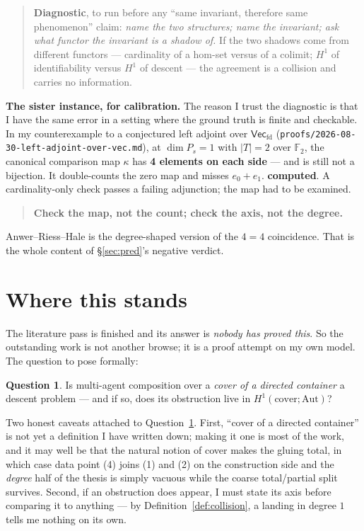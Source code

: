 \documentclass[11pt]{article}
\theoremstyle{plain}
\theoremstyle{definition}
\newtheorem{question}[theorem]{Question}
\theoremstyle{remark}
\newcommand{\Vecfd}{\mathsf{Vec}_{\mathrm{fd}}}
\newcommand{\Aut}{\mathrm{Aut}}
\newcommand{\grade}[1]{\textsf{\small\textbf{#1}}}
\begin{document}
\begin{quote}
\textbf{Diagnostic}, to run before any ``same invariant, therefore same phenomenon''
claim: \emph{name the two structures; name the invariant; ask what functor the
invariant is a shadow of.} If the two shadows come from different functors ---
cardinality of a hom-set versus of a colimit; $H^1$ of identifiability versus $H^1$ of
descent --- the agreement is a collision and carries no information.
\end{quote}

\noindent\textbf{The sister instance, for calibration.} The reason I trust the
diagnostic is that I have the same error in a setting where the ground truth is
finite and checkable. In my counterexample to a conjectured left adjoint over
$\Vecfd$ (\texttt{proofs/2026-08-30-left-adjoint-over-vec.md}), at
$\dim P_s=1$ with $|T|=2$ over $\mathbb F_2$, the canonical comparison map $\kappa$
has \textbf{4 elements on each side} --- and is still not a bijection. It
double-counts the zero map and misses $e_0+e_1$. \grade{computed}. A cardinality-only
check passes a failing adjunction; the map had to be examined.

\begin{quote}
\textbf{Check the map, not the count; check the axis, not the degree.}
\end{quote}

\noindent Anwer--Riess--Hale is the degree-shaped version of the $4=4$ coincidence.
That is the whole content of \S\ref{sec:pred}'s negative verdict.

\section{Where this stands}\label{sec:stands}

The literature pass is finished and its answer is \emph{nobody has proved this}. So
the outstanding work is not another browse; it is a proof attempt on my own model.
The question to pose formally:

\begin{question}\label{q:descent}
Is multi-agent composition over a \emph{cover of a directed container} a descent
problem --- and if so, does its obstruction live in $H^1(\text{cover};\Aut)$?
\end{question}

Two honest caveats attached to Question~\ref{q:descent}. First, ``cover of a directed
container'' is not yet a definition I have written down; making it one is most of the
work, and it may well be that the natural notion of cover makes the gluing total, in
which case data point (4) joins (1) and (2) on the construction side and the
\emph{degree} half of the thesis is simply vacuous while the coarse total/partial
split survives. Second, if an obstruction does appear, I must state its axis before
comparing it to anything --- by Definition~\ref{def:collision}, a landing in degree
$1$ tells me nothing on its own.
\end{document}
